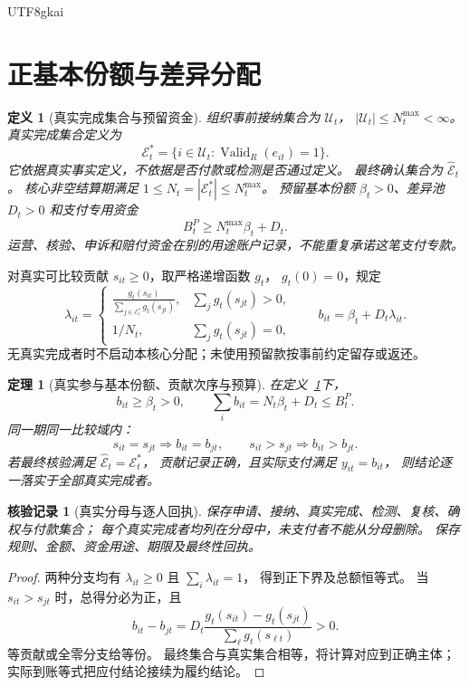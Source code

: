 \documentclass[12pt,a4paper,openany]{report}
\newtheorem{definition}{定义}[chapter]
\newtheorem{theorem}{定理}[chapter]
\newtheorem{Certificate}{核验记录}[chapter]
\newcommand{\Valid}{\operatorname{Valid}}
\begin{document}
\begin{CJK*}{UTF8}{gkai}
\section{正基本份额与差异分配}
\begin{definition}[真实完成集合与预留资金]
\label{def:distribution}
组织事前接纳集合为 \(\mathcal U_t\)，
\(|\mathcal U_t|\le N_t^{\max}<\infty\)。
真实完成集合定义为
\[
\mathcal E_t^*=\{i\in\mathcal U_t:\Valid_R(e_{it})=1\}.
\]
它依据真实事实定义，不依据是否付款或检测是否通过定义。
最终确认集合为 \(\widehat{\mathcal E}_t\)。
核心非空结算期满足 \(1\le N_t=|\mathcal E_t^*|\le N_t^{\max}\)。
预留基本份额 \(\beta_t>0\)、差异池 \(D_t>0\) 和支付专用资金
\[
B_t^P\ge N_t^{\max}\beta_t+D_t.
\]
运营、核验、申诉和赔付资金在别的用途账户记录，不能重复承诺这笔支付专款。
\end{definition}

对真实可比较贡献 \(s_{it}\ge0\)，取严格递增函数 \(g_t\)，
\(g_t(0)=0\)，规定
\[
\lambda_{it}=
\begin{cases}
\displaystyle\frac{g_t(s_{it})}{\sum_{j\in\mathcal E_t^*}g_t(s_{jt})},
&\sum_jg_t(s_{jt})>0,\\[1.2ex]
1/N_t,&\sum_jg_t(s_{jt})=0,
\end{cases}
\qquad b_{it}=\beta_t+D_t\lambda_{it}.
\]
无真实完成者时不启动本核心分配；未使用预留款按事前约定留存或返还。

\begin{theorem}[真实参与基本份额、贡献次序与预算]
\label{thm:distribution}
在定义~\ref{def:distribution}下，
\[
b_{it}\ge\beta_t>0,\qquad
\sum_i b_{it}=N_t\beta_t+D_t\le B_t^P.
\]
同一期同一比较域内：
\[
s_{it}=s_{jt}\Longrightarrow b_{it}=b_{jt},
\qquad
s_{it}>s_{jt}\Longrightarrow b_{it}>b_{jt}.
\]
若最终核验满足 \(\widehat{\mathcal E}_t=\mathcal E_t^*\)，
贡献记录正确，且实际支付满足 \(y_{it}=b_{it}\)，
则结论逐一落实于全部真实完成者。
\end{theorem}
\begin{Certificate}[真实分母与逐人回执]
保存申请、接纳、真实完成、检测、复核、确权与付款集合；
每个真实完成者均列在分母中，未支付者不能从分母删除。
保存规则、金额、资金用途、期限及最终性回执。
\end{Certificate}
\begin{proof}
两种分支均有 \(\lambda_{it}\ge0\) 且 \(\sum_i\lambda_{it}=1\)，
得到正下界及总额恒等式。
当 \(s_{it}>s_{jt}\) 时，总得分必为正，且
\[
b_{it}-b_{jt}
=D_t\frac{g_t(s_{it})-g_t(s_{jt})}{\sum_\ell g_t(s_{\ell t})}>0.
\]
等贡献或全零分支给等份。
最终集合与真实集合相等，将计算对应到正确主体；
实际到账等式把应付结论接续为履约结论。
\end{proof}


\end{CJK*}
\end{document}
